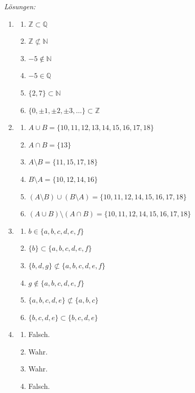 \emph{Lösungen:}
\begin{enumerate}
    \item
          \begin{enumerate}
              \item \(\mathbb{Z} \subset \mathbb{Q}\)
              \item \(\mathbb{Z} \not\subset \mathbb{N}\)
              \item \(-5 \notin \mathbb{N}\)
              \item \(-5 \in \mathbb{Q}\)
              \item \(\{2,7\} \subset \mathbb{N}\)
              \item \(\{0,\pm1,\pm2,\pm3,\ldots\} \subset \mathbb{Z}\)
          \end{enumerate}

    \item
          \begin{enumerate}
              \item \(A \cup B = \{10,11,12,13,14,15,16,17,18\}\)
              \item \(A \cap B = \{13\}\)
              \item \(A \setminus B = \{11,15,17,18\}\)
              \item \(B \setminus A = \{10,12,14,16\}\)
              \item \((A \setminus B)\cup(B \setminus A) = \{10,11,12,14,15,16,17,18\}\)
              \item \((A \cup B)\setminus(A \cap B) = \{10,11,12,14,15,16,17,18\}\)
          \end{enumerate}

    \item
          \begin{enumerate}
              \item \(b \in \{a,b,c,d,e,f\}\)
              \item \(\{b\} \subset \{a,b,c,d,e,f\}\)
              \item \(\{b,d,g\} \not\subset \{a,b,c,d,e,f\}\)
              \item \(g \notin \{a,b,c,d,e,f\}\)
              \item \(\{a,b,c,d,e\} \not\subset \{a,b,c\}\)
              \item \(\{b,c,d,e\} \subset \{b,c,d,e\}\)
          \end{enumerate}

    \item
          \begin{enumerate}
              \item Falsch.
              \item Wahr.
              \item Wahr.
              \item Falsch.
          \end{enumerate}


\end{enumerate}

